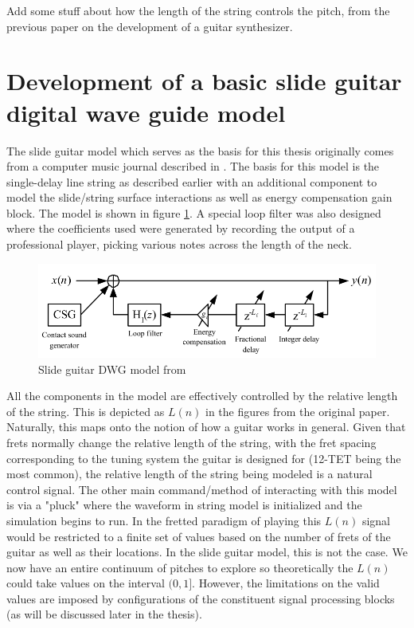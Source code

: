 \documentclass[main.tex]{subfiles}
\begin{document}
Add some stuff about how the length of the string controls the pitch, from the previous paper on the development of a guitar synthesizer.

\section{Development of a basic slide guitar digital wave guide model}

The slide guitar model which serves as the basis for this thesis originally comes from a computer music journal described in . The basis for this model is the single-delay line string as described earlier with an additional component to model the slide/string surface interactions as well as energy compensation gain block. The model is shown in figure \ref{fig:original_DWG}. A special loop filter was also designed where the coefficients used were generated by recording the output of a professional player, picking various notes across the length of the neck.

\begin{figure}[h]
    \centering
    \includegraphics[scale=.75]{./images/pictures/SDL_slide_model.PNG}
    \caption{Slide guitar DWG model from }
    \label{fig:original_DWG}
\end{figure}

All the components in the model are effectively controlled by the relative length of the string. This is depicted as $L(n)$ in the figures from the original paper. Naturally, this maps onto the notion of how a guitar works in general. Given that frets normally change the relative length of the string, with the fret spacing corresponding to the tuning system the guitar is designed for (12-TET being the most common), the relative length of the string being modeled is a natural control signal. The other main command/method of interacting with this model is via a "pluck" where the waveform in string model is initialized and the simulation begins to run. In the fretted paradigm of playing this $L(n)$ signal would be restricted to a finite set of values based on the number of frets of the guitar as well as their locations. In the slide guitar model, this is not the case. We now have an entire continuum of pitches to explore so theoretically the $L(n)$ could take values on the interval $(0,1]$. However, the limitations on the valid values are imposed by configurations of the constituent signal processing blocks (as will be discussed later in the thesis).
\end{document}
